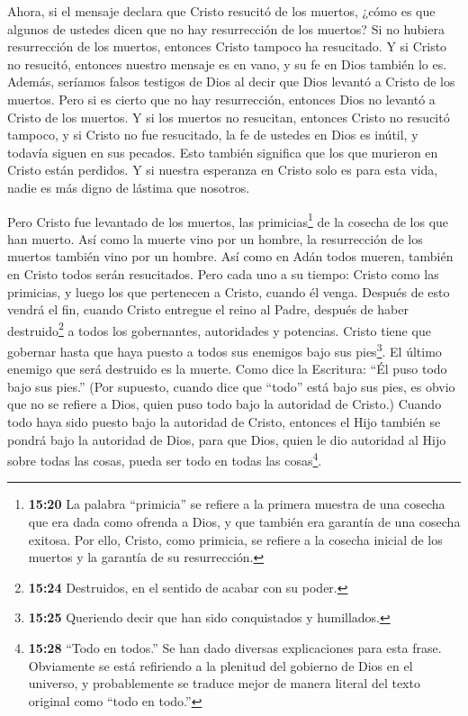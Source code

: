  Ahora, si el mensaje declara que Cristo resucitó de los
muertos, ¿cómo es que algunos de ustedes dicen que no hay resurrección
de los muertos?  Si no hubiera resurrección de los muertos,
entonces Cristo tampoco ha resucitado.  Y si Cristo no
resucitó, entonces nuestro mensaje es en vano, y su fe en Dios también
lo es.  Además, seríamos falsos testigos de Dios al decir
que Dios levantó a Cristo de los muertos. Pero si es cierto que no hay
resurrección, entonces Dios no levantó a Cristo de los muertos.
 Y si los muertos no resucitan, entonces Cristo no resucitó
tampoco,  y si Cristo no fue resucitado, la fe de ustedes
en Dios es inútil, y todavía siguen en sus pecados.  Esto
también significa que los que murieron en Cristo están perdidos.
 Y si nuestra esperanza en Cristo solo es para esta vida,
nadie es más digno de lástima que nosotros.

 Pero Cristo fue levantado de los muertos, las
primicias\footnote{\textbf{15:20} La palabra ``primicia'' se refiere a
  la primera muestra de una cosecha que era dada como ofrenda a Dios, y
  que también era garantía de una cosecha exitosa. Por ello, Cristo,
  como primicia, se refiere a la cosecha inicial de los muertos y la
  garantía de su resurrección.} de la cosecha de los que han muerto.
 Así como la muerte vino por un hombre, la resurrección de
los muertos también vino por un hombre.  Así como en Adán
todos mueren, también en Cristo todos serán resucitados. 
Pero cada uno a su tiempo: Cristo como las primicias, y luego los que
pertenecen a Cristo, cuando él venga.  Después de esto
vendrá el fin, cuando Cristo entregue el reino al Padre, después de
haber destruido\footnote{\textbf{15:24} Destruidos, en el sentido de
  acabar con su poder.} a todos los gobernantes, autoridades y
potencias.  Cristo tiene que gobernar hasta que haya puesto
a todos sus enemigos bajo sus pies\footnote{\textbf{15:25} Queriendo
  decir que han sido conquistados y humillados.}.  El
último enemigo que será destruido es la muerte.  Como dice
la Escritura: ``Él puso todo bajo sus pies.'' (Por supuesto, cuando dice
que ``todo'' está bajo sus pies, es obvio que no se refiere a Dios,
quien puso todo bajo la autoridad de Cristo.)  Cuando todo
haya sido puesto bajo la autoridad de Cristo, entonces el Hijo también
se pondrá bajo la autoridad de Dios, para que Dios, quien le dio
autoridad al Hijo sobre todas las cosas, pueda ser todo en todas las
cosas\footnote{\textbf{15:28} ``Todo en todos.'' Se han dado diversas
  explicaciones para esta frase. Obviamente se está refiriendo a la
  plenitud del gobierno de Dios en el universo, y probablemente se
  traduce mejor de manera literal del texto original como ``todo en
  todo.''}.


